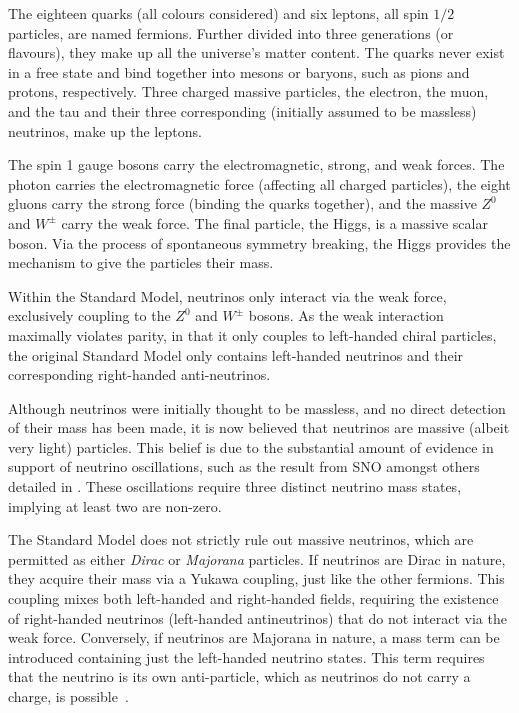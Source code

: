 The eighteen quarks (all colours considered) and six leptons, all spin $1/2$ particles, are named
fermions. Further divided into three generations (or flavours), they make up all the universe's
matter content. The quarks never exist in a free state and bind together into mesons or baryons,
such as pions and protons, respectively.  Three charged massive particles, the electron, the muon,
and the tau and their three corresponding (initially assumed to be massless) neutrinos, make up
the leptons.

The spin 1 gauge bosons carry the electromagnetic, strong, and weak forces. The photon carries the
electromagnetic force (affecting all charged particles), the eight gluons carry the strong force
(binding the quarks together), and the massive $Z^{0}$ and $W^{\pm}$ carry the weak force. The
final particle, the Higgs, is a massive scalar boson. Via the process of spontaneous symmetry
breaking, the Higgs provides the mechanism to give the particles their mass.

Within the Standard Model, neutrinos only interact via the weak force, exclusively coupling to the
$Z^{0}$ and $W^{\pm}$ bosons. As the weak interaction maximally violates parity, in that it only
couples to left-handed chiral particles, the original Standard Model only contains left-handed
neutrinos and their corresponding right-handed anti-neutrinos.

Although neutrinos were initially thought to be massless, and no direct detection of their mass
has been made, it is now believed that neutrinos are massive (albeit very light) particles. This
belief is due to the substantial amount of evidence in support of neutrino oscillations, such as
the result from SNO amongst others detailed in . These oscillations
require three distinct neutrino mass states, implying at least two are non-zero.

The Standard Model does not strictly rule out massive neutrinos, which are permitted as either
\emph{Dirac} or \emph{Majorana} particles. If neutrinos are Dirac in nature, they acquire their
mass via a Yukawa coupling, just like the other fermions. This coupling mixes both left-handed and
right-handed fields, requiring the existence of right-handed neutrinos (left-handed antineutrinos)
that do not interact via the weak force. Conversely, if neutrinos are Majorana in nature, a mass
term can be introduced containing just the left-handed neutrino states. This term requires that
the neutrino is its own anti-particle, which as neutrinos do not carry a charge, is
possible~\cite{particle2020}.

